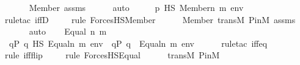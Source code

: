 \begin{isabellebody}
\ \ \ \ \isamarkupfalse%
\ Member\ assms\isanewline
\ \ \ \ \isamarkupfalse%
\ auto\isanewline
\ \ \isamarkupfalse%
\ \isamarkupfalse%
\ {\isachardoublequoteopen}p\ {\isasymtturnstile}HS\ Member{\isacharparenleft}{\kern0pt}n{\isacharcomma}{\kern0pt}\ m{\isacharparenright}{\kern0pt}\ env{\isachardoublequoteclose}\ \isanewline
\ \ \ \ \isamarkupfalse%
{\isacharparenleft}{\kern0pt}rule{\isacharunderscore}{\kern0pt}tac\ iffD{}{\isacharparenright}{\kern0pt}\isanewline
\ \ \ \ \isamarkupfalse%
{\isacharparenleft}{\kern0pt}rule\ ForcesHS{\isacharunderscore}{\kern0pt}Member{\isacharparenright}{\kern0pt}\isanewline
\ \ \ \ \isamarkupfalse%
\ Member\ transM\ P{\isacharunderscore}{\kern0pt}in{\isacharunderscore}{\kern0pt}M\ assms\ \isanewline
\ \ \ \ \isamarkupfalse%
\ auto\isanewline
{}\isamarkupfalse%
\isanewline
\ \ \isamarkupfalse%
\ {\isacharparenleft}{\kern0pt}Equal\ n\ m{\isacharparenright}{\kern0pt}\isanewline
\ \ \isamarkupfalse%
\ \isamarkupfalse%
\ {\isachardoublequoteopen}{\isacharbraceleft}{\kern0pt}q{\isasymin}P{\isachardot}{\kern0pt}\ {\isacharparenleft}{\kern0pt}q\ {\isasymtturnstile}HS\ {\isacharparenleft}{\kern0pt}Equal{\isacharparenleft}{\kern0pt}n{\isacharcomma}{\kern0pt}\ m{\isacharparenright}{\kern0pt}{\isacharparenright}{\kern0pt}\ env{\isacharparenright}{\kern0pt}{\isacharbraceright}{\kern0pt}\ {\isacharequal}{\kern0pt}\ {\isacharbraceleft}{\kern0pt}q{\isasymin}P{\isachardot}{\kern0pt}\ {\isacharparenleft}{\kern0pt}q\ {\isasymtturnstile}\ {\isacharparenleft}{\kern0pt}Equal{\isacharparenleft}{\kern0pt}n{\isacharcomma}{\kern0pt}\ m{\isacharparenright}{\kern0pt}{\isacharparenright}{\kern0pt}\ env{\isacharparenright}{\kern0pt}{\isacharbraceright}{\kern0pt}{\isachardoublequoteclose}\ \isanewline
\ \ \ \ \isamarkupfalse%
{\isacharparenleft}{\kern0pt}rule{\isacharunderscore}{\kern0pt}tac\ iff{\isacharunderscore}{\kern0pt}eq{\isacharparenright}{\kern0pt}\isanewline
\ \ \ \ \isamarkupfalse%
{\isacharparenleft}{\kern0pt}rule\ iff{\isacharunderscore}{\kern0pt}flip{\isacharparenright}{\kern0pt}\isanewline
\ \ \ \ \isamarkupfalse%
{\isacharparenleft}{\kern0pt}rule\ ForcesHS{\isacharunderscore}{\kern0pt}Equal{\isacharparenright}{\kern0pt}\isanewline
\ \ \ \ \isamarkupfalse%
\ transM\ P{\isacharunderscore}{\kern0pt}in{\isacharunderscore}{\kern0pt}M\isanewline
\ \ \ \ \isamarkupfalse%

\end{isabellebody}
